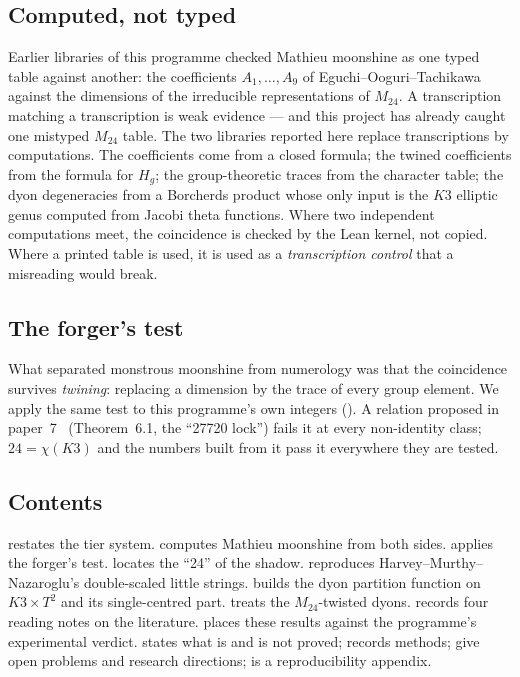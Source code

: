\documentclass[11pt,a4paper]{article}
\theoremstyle{remark}
\newcommand{\Mtf}{M_{24}}
\begin{document}
\subsection{Computed, not typed}
Earlier libraries of this programme checked Mathieu moonshine as one typed table against another:
the coefficients $A_1,\dots,A_9$ of Eguchi--Ooguri--Tachikawa~\cite{EOT2010} against the dimensions
of the irreducible representations of $\Mtf$. A transcription matching a transcription is weak
evidence --- and this project has already caught one mistyped $\Mtf$ table. The two libraries reported
here replace transcriptions by computations. The coefficients come from a closed formula; the twined
coefficients from the formula for $H_g$; the group-theoretic traces from the character table; the
dyon degeneracies from a Borcherds product whose only input is the $K3$ elliptic genus computed from
Jacobi theta functions. Where two independent computations meet, the coincidence is checked by the
Lean kernel, not copied. Where a printed table is used, it is used as a \emph{transcription control}
that a misreading would break.

\subsection{The forger's test}
What separated monstrous moonshine from numerology was that the coincidence survives \emph{twining}:
replacing a dimension by the trace of every group element. We apply the same test to this programme's
own integers (). A relation proposed in paper~7~\cite{Callens2026Paper7}
(Theorem~6.1, the ``27720 lock'') fails it at every non-identity class; $24=\chi(K3)$ and the
numbers built from it pass it everywhere they are tested.

\subsection{Contents}
 restates the tier system.  computes Mathieu moonshine from both
sides.  applies the forger's test.  locates the ``24'' of the
shadow.  reproduces Harvey--Murthy--Nazaroglu's double-scaled little strings.
 builds the dyon partition function on $K3\times T^2$ and its single-centred part.
 treats the $\Mtf$-twisted dyons.  records four reading notes on
the literature.  places these results against the programme's experimental verdict.
 states what is and is not proved;  records methods;
 give open problems and research directions;  is a
reproducibility appendix.
\end{document}
